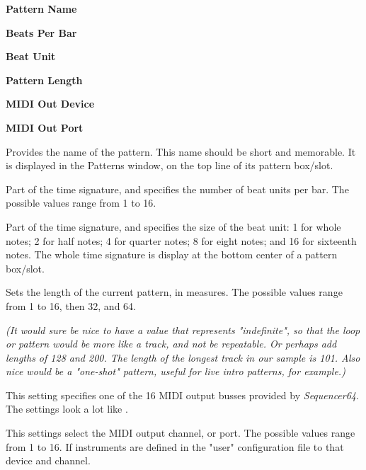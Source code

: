    \begin{enumber}
      \item \textbf{Pattern Name}
      \item \textbf{Beats Per Bar}
      \item \textbf{Beat Unit}
      \item \textbf{Pattern Length}
      \item \textbf{MIDI Out Device}
      \item \textbf{MIDI Out Port}
   \end{enumber}

   \setcounter{ItemCounter}{0}      %

   Provides the name of the pattern.
   This name should be short and memorable.
   It is displayed in the Patterns window, on the top line of its pattern
   box/slot.

   Part of the time signature, and specifies the number of beat units per bar.
   The possible values range from 1 to 16.

   Part of the time signature, and specifies the size of the beat unit:
   1 for whole notes; 2 for half notes; 4 for quarter notes; 8 for eight notes;
   and 16 for sixteenth notes.
   The whole time signature is display at the bottom center of a pattern
   box/slot.

   Sets the length of the current pattern, in measures.
   The possible values range from 1 to 16, then 32, and 64.

   \textsl{(It would sure be nice to have a value that represents
   "indefinite", so that the loop or pattern would be more like a track,
   and not be repeatable.  Or perhaps add lengths of 128 and 200.  The length
   of the longest track in our sample is 101.  Also nice would be a "one-shot"
   pattern, useful for live intro patterns, for example.)}

   This setting specifies one of the 16 MIDI output busses provided by
   \textsl{Sequencer64}.  The settings look a lot like
   .

   This settings select the MIDI output channel, or port.
   The possible values range from 1 to 16.
   If instruments are defined in the "user" configuration file
   to that device and channel.


